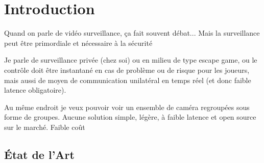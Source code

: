 \documentclass[12pt, a4paper]{report}
\begin{document}
\makeutbmfrontcover{}
\tableofcontents
\chapter{Introduction}
Quand on parle de vidéo surveillance, ça fait souvent débat...\newline
Mais la surveillance peut être primordiale et nécessaire à la sécurité\newline

Je parle de surveillance privée (chez soi) ou en milieu de type escape game, ou le contrôle doit être instantané en cas de problème ou de risque pour les joueurs, mais aussi de moyen de communication unilatéral en temps réel (et donc faible latence obligatoire).\newline

Au même endroit je veux pouvoir voir un ensemble de caméra regroupées sous forme de groupes.\newline
Aucune solution simple, légère, à faible latence et open source sur le marché.\newline
Faible coût\newline

\section{État de l'Art}
\end{document}
